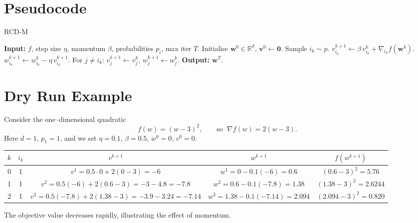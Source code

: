 \documentclass{article}
\newcommand{\R}{\mathbb{R}}
\begin{document}
\section*{Pseudocode}
\begin{algorithm}[H]
\caption{RCD‑M}
\begin{algorithmic}[1]
\STATE \textbf{Input:} $f$, step size $\eta$, momentum $\beta$, probabilities $p_i$, max iter $T$.
\STATE Initialise $\mathbf w^{0}\in\R^{d}$, $\mathbf v^{0}\gets \mathbf 0$.
    \STATE Sample $i_k\sim p$.
    \STATE $v^{k+1}_{i_k}\gets \beta\,v^{k}_{i_k}+ \nabla_{i_k} f(\mathbf w^{k})$.
    \STATE $w^{k+1}_{i_k}\gets w^{k}_{i_k}-\eta\, v^{k+1}_{i_k}$.
    \STATE For $j\neq i_k$: $v^{k+1}_{j}\gets v^{k}_{j}$, $w^{k+1}_{j}\gets w^{k}_{j}$.
\ENDFOR
\STATE \textbf{Output:} $\mathbf w^{T}$.
\end{algorithmic}
\end{algorithm}

\section*{Dry Run Example}
Consider the one–dimensional quadratic 
\[
    f(w)= (w-3)^{2}, \qquad\text{so }\;\nabla f(w)=2(w-3).
\]
Here $d=1$, $p_1=1$, and we set $\eta=0.1$, $\beta=0.5$, $w^{0}=0$, $v^{0}=0$.

\begin{center}
\begin{tabular}{c|c|c|c|c}
$k$ & $i_k$ & $v^{k+1}$ & $w^{k+1}$ & $f(w^{k+1})$\\ \hline
0 & 1 & $v^{1}=0.5\cdot0+2(0-3)=-6$ & $w^{1}=0-0.1(-6)=0.6$ & $(0.6-3)^2=5.76$\\
1 & 1 & $v^{2}=0.5(-6)+2(0.6-3)=-3-4.8=-7.8$ & $w^{2}=0.6-0.1(-7.8)=1.38$ & $(1.38-3)^2=2.6244$\\
2 & 1 & $v^{3}=0.5(-7.8)+2(1.38-3)=-3.9-3.24=-7.14$ & $w^{3}=1.38-0.1(-7.14)=2.094$ & $(2.094-3)^2=0.820$\\
\end{tabular}
\end{center}
The objective value decreases rapidly, illustrating the effect of momentum.

\newpage
\end{document}

